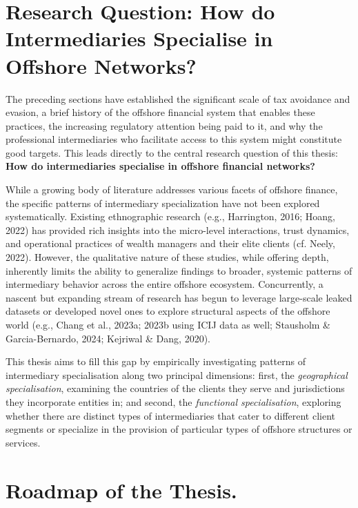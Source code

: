 \section{Research Question: How do Intermediaries Specialise in Offshore Networks?}
\label{sec:1_5}

The preceding sections have established the significant scale of tax avoidance and evasion, a brief history of the offshore financial system that enables these practices, the increasing regulatory attention being paid to it, and why the professional intermediaries who facilitate access to this system might constitute good targets. This leads directly to the central research question of this thesis: \textbf{How do intermediaries specialise in offshore financial networks?}

While a growing body of literature addresses various facets of offshore finance, the specific patterns of intermediary specialization have not been explored systematically. Existing ethnographic research (e.g., Harrington, 2016; Hoang, 2022) has provided rich insights into the micro-level interactions, trust dynamics, and operational practices of wealth managers and their elite clients (cf. Neely, 2022). However, the qualitative nature of these studies, while offering depth, inherently limits the ability to generalize findings to broader, systemic patterns of intermediary behavior across the entire offshore ecosystem. Concurrently, a nascent but expanding stream of research has begun to leverage large-scale leaked datasets or developed novel ones to explore structural aspects of the offshore world (e.g., Chang et al., 2023a; 2023b using ICIJ data as well; Stausholm \& Garcia-Bernardo, 2024; Kejriwal \& Dang, 2020). 

This thesis aims to fill this gap by empirically investigating patterns of intermediary specialisation along two principal dimensions: first, the \textit{geographical specialisation}, examining the countries of the clients they serve and jurisdictions they incorporate entities in; and second, the \textit{functional specialisation}, exploring whether there are distinct types of intermediaries that cater to different client segments or specialize in the provision of particular types of offshore structures or services.

\section{Roadmap of the Thesis.}
\label{sec:1_6}

